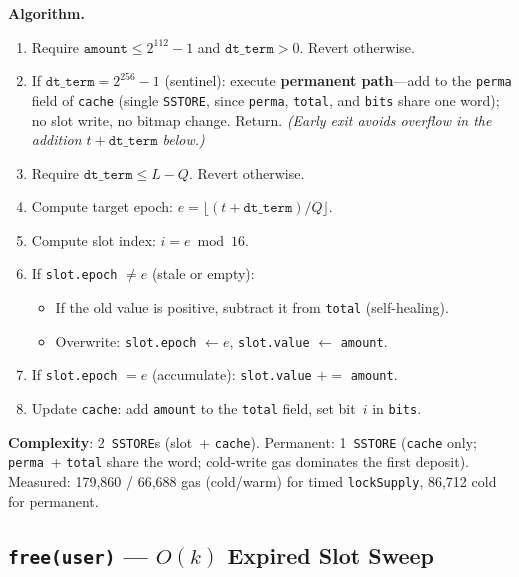 \documentclass[10pt,a4paper,twocolumn]{article}
\begin{document}
\textbf{Algorithm.}
\begin{enumerate}[leftmargin=*, nosep, start=0]
\item Require $\texttt{amount} \leq 2^{112}{-}1$ and $\texttt{dt\_term} > 0$. Revert otherwise.
\item If $\texttt{dt\_term} = 2^{256}{-}1$ (sentinel): execute \textbf{permanent path}---add to the \texttt{perma} field of \texttt{cache} (single \texttt{SSTORE}, since \texttt{perma}, \texttt{total}, and \texttt{bits} share one word); no slot write, no bitmap change. Return. \emph{(Early exit avoids overflow in the addition $t + \texttt{dt\_term}$ below.)}
\item Require $\texttt{dt\_term} \leq L - Q$. Revert otherwise.
\item Compute target epoch: $e = \lfloor(t + \texttt{dt\_term}) / Q\rfloor$.
\item Compute slot index: $i = e \bmod 16$.
\item If \texttt{slot.epoch} $\neq e$ (stale or empty):
    \begin{itemize}[nosep]
    \item If the old value is positive, subtract it from \texttt{total} (self-healing).
    \item Overwrite: \texttt{slot.epoch} $\leftarrow e$, \texttt{slot.value} $\leftarrow$ \texttt{amount}.
    \end{itemize}
\item If \texttt{slot.epoch} $= e$ (accumulate): \texttt{slot.value} $\mathrel{+}=$ \texttt{amount}.
\item Update \texttt{cache}: add \texttt{amount} to the \texttt{total} field, set bit~$i$ in \texttt{bits}.
\end{enumerate}

\textbf{Complexity}: 2~\texttt{SSTORE}s (slot~+ \texttt{cache}). Permanent: 1~\texttt{SSTORE} (\texttt{cache} only; \texttt{perma}~+ \texttt{total} share the word; cold-write gas dominates the first deposit). Measured: 179{,}860 / 66{,}688 gas (cold/warm) for timed \texttt{lockSupply}, 86{,}712 cold for permanent.

\subsection{\texttt{free(user)} --- $O(k)$ Expired Slot Sweep}
\label{subsec:free}
\end{document}
